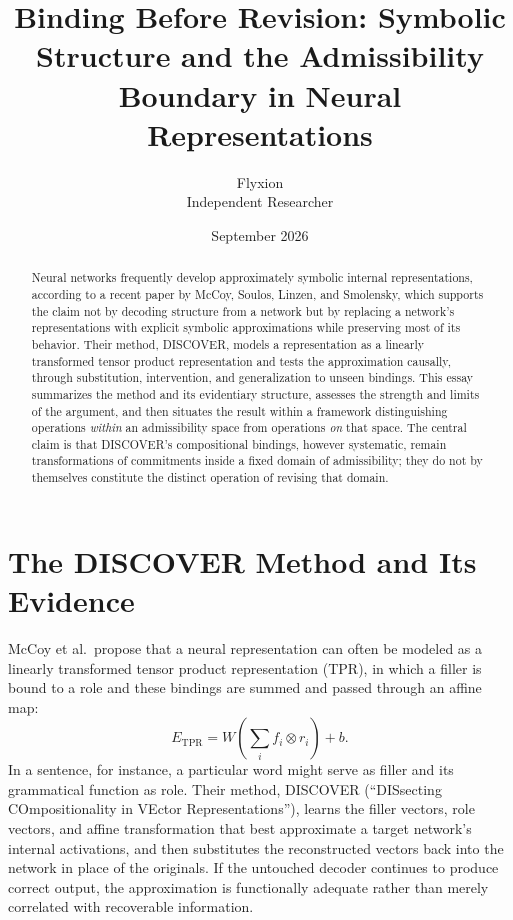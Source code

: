 \documentclass[11pt]{article}
\title{Binding Before Revision: Symbolic Structure and the Admissibility Boundary in Neural Representations}
\author{Flyxion \\ Independent Researcher}
\date{September 2026}
\begin{document}
\maketitle

\begin{abstract}
Neural networks frequently develop approximately symbolic internal representations, according to a recent paper by McCoy, Soulos, Linzen, and Smolensky, which supports the claim not by decoding structure from a network but by replacing a network's representations with explicit symbolic approximations while preserving most of its behavior. Their method, DISCOVER, models a representation as a linearly transformed tensor product representation and tests the approximation causally, through substitution, intervention, and generalization to unseen bindings. This essay summarizes the method and its evidentiary structure, assesses the strength and limits of the argument, and then situates the result within a framework distinguishing operations \emph{within} an admissibility space from operations \emph{on} that space. The central claim is that DISCOVER's compositional bindings, however systematic, remain transformations of commitments inside a fixed domain of admissibility; they do not by themselves constitute the distinct operation of revising that domain.
\end{abstract}

\section{The DISCOVER Method and Its Evidence}

McCoy et al.\ propose that a neural representation can often be modeled as a linearly transformed tensor product representation (TPR), in which a filler is bound to a role and these bindings are summed and passed through an affine map:
\[
E_{\mathrm{TPR}} = W\left(\sum_i f_i \otimes r_i\right) + b.
\]
In a sentence, for instance, a particular word might serve as filler and its grammatical function as role. Their method, DISCOVER (``DISsecting COmpositionality in VEctor Representations''), learns the filler vectors, role vectors, and affine transformation that best approximate a target network's internal activations, and then substitutes the reconstructed vectors back into the network in place of the originals. If the untouched decoder continues to produce correct output, the approximation is functionally adequate rather than merely correlated with recoverable information.
\end{document}
